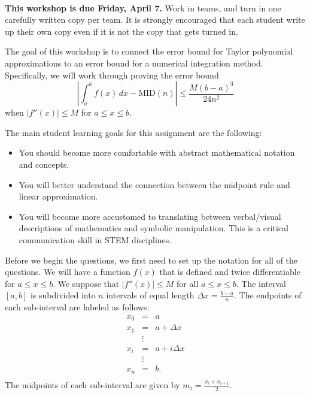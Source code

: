 \documentclass[letterpaper,11pt]{examPTP}
\begin{document}
\pagestyle{headandfoot}


\noindent \underline{\hspace{6.5in}}


\begin{center}
\addpoints
\gradetable[h]  
\end{center}
\workshopinstructions
\\
{\bf This workshop is due Friday, April 7.} Work in teams, and turn in one carefully written copy per team. It is strongly encouraged that each student write up their own copy even if it is not the copy that gets turned in.
\par 
The goal of this workshop is to connect the error bound for Taylor polynomial approximations to an error bound for a numerical integration method. Specifically, we will work through proving the error bound
\[
\left|\int_{a}^{b} f(x)\,dx - \mbox{MID}(n)\right|\leq \frac{M(b-a)^3}{24n^2}
\]
when $|f''(x)|\leq M$ for $a\leq x\leq b$.
\par
The main student learning goals for this assignment are the following:
\begin{itemize}
\item You should become more comfortable with abstract mathematical notation and concepts.
\item You will better understand the connection between the midpoint rule and linear approximation.
\item You will become more accustomed to translating between verbal/visual descriptions of mathematics and symbolic manipulation. This is a critical communication skill in STEM disciplines.
\end{itemize} 
\par
Before we begin the questions, we first need to set up the notation for all of the questions. We will have a function $f(x)$ that is defined and twice differentiable for $a\leq x\leq b$. We suppose that $|f''(x)|\leq M$ for all $a\leq x\leq b$. The interval $[a,b]$ is subdivided into $n$ intervals of equal length $\Delta x = \frac{b-a}{n}$. The endpoints of each sub-interval are labeled as follows:
\begin{eqnarray*}
x_0 & = &a\\
x_1 & = &a+\Delta x\\
\ & \vdots & \\
x_i & = & a + i\Delta x\\
\ & \vdots & \\
x_n & = & b.\\
\end{eqnarray*}
The midpoints of each sub-interval are given by $m_i = \frac{x_i+x_{i+1}}{2}$. 
\end{document}
